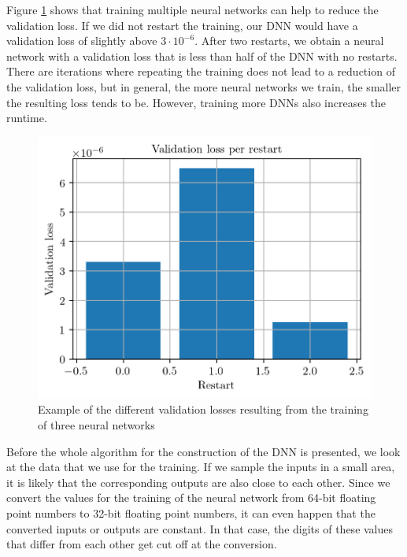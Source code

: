 Figure \ref{DNNRestartsPlot} shows that training multiple neural networks can help to reduce the validation loss. If we did not restart the training, our DNN would have a validation loss of slightly above $3\cdot10^{-6}$. After two restarts, we obtain a neural network with a validation loss that is less than half of the DNN with no restarts. There are iterations where repeating the training does not lead to a reduction of the validation loss, but in general, the more neural networks we train, the smaller the resulting loss tends to be. However, training more DNNs also increases the runtime.\\

\begin{figure}
\centering
\includegraphics{Plots/DNNRestarts.png}
\caption{\label{DNNRestartsPlot}Example of the different validation losses resulting from the training of three neural networks}
\end{figure}

Before the whole algorithm for the construction of the DNN is presented, we look at the data that we use for the training. If we sample the inputs in a small area, it is likely that the corresponding outputs are also close to each other. Since we convert the values for the training of the neural network from 64-bit floating point numbers to 32-bit floating point numbers, it can even happen that the converted inputs or outputs are constant. In that case, the digits of these values that differ from each other get cut off at the conversion.

